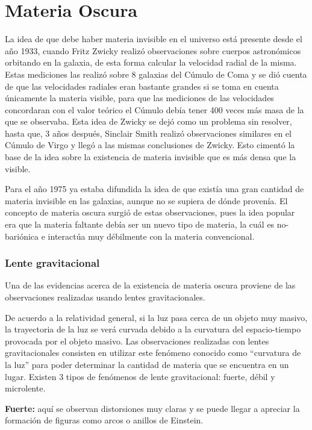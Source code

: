 \documentclass{article}
\begin{document}
\section*{Materia Oscura} 
La idea de que debe haber materia invisible en el universo est\'a presente desde el a\~no 1933, cuando Fritz Zwicky realiz\'o observaciones sobre cuerpos astron\'omicos orbitando en la galaxia, de esta forma calcular la velocidad radial de la misma. Estas mediciones las realiz\'o sobre 8 galaxias del C\'umulo de Coma y se di\'o cuenta de que las velocidades radiales eran bastante grandes si se toma en cuenta \'unicamente la materia visible, para que las mediciones de las velocidades concordaran con el valor te\'orico el C\'umulo deb\'ia tener 400 veces m\'as masa de la que se observaba. Esta idea de Zwicky se dej\'o como un problema sin resolver, hasta que, 3 a\~nos despu\'es, Sinclair Smith realiz\'o observaciones similares en el C\'umulo de Virgo y lleg\'o a las mismas conclusiones de Zwicky. Esto ciment\'o la base de la idea sobre la existencia de materia invisible que es m\'as densa que la visible.

Para el a\~no 1975 ya estaba difundida la idea de que exist\'ia una gran cantidad de materia invisible en las galaxias, aunque no se supiera de d\'onde proven\'ia. El concepto de materia oscura surgi\'o de estas observaciones, pues la idea popular era que la materia faltante deb\'ia ser un nuevo tipo de materia, la cu\'al es no-bari\'onica e interact\'ua muy d\'ebilmente con la materia convencional.

\subsubsection*{Lente gravitacional}
Una de las evidencias acerca de la existencia de materia oscura proviene de las observaciones realizadas usando lentes gravitacionales.

 De acuerdo a la relatividad general, si la luz pasa cerca de un objeto muy masivo, la trayectoria de la luz se ver\'a curvada debido a la curvatura del espacio-tiempo provocada por el objeto masivo.  Las observaciones realizadas con lentes gravitacionales consisten en utilizar este fen\'omeno conocido como ``curvatura de la luz'' para poder determinar la cantidad de materia que se encuentra en un lugar. Existen 3 tipos de fen\'omenos de lente gravitacional: fuerte, d\'ebil y microlente. 
 
 \textbf{Fuerte:} aqu\'i se observan distorsiones muy claras y se puede llegar a apreciar la formaci\'on de figuras como arcos o anillos de Einstein.
\end{document}
